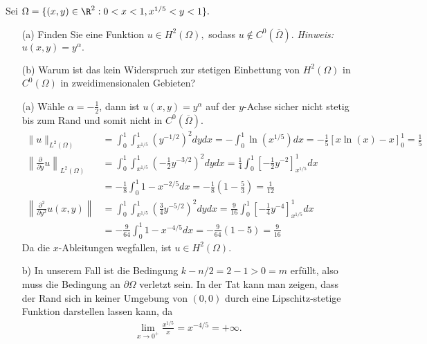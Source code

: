 
\begin{exercise}

  Sei $\Omega = \{(x, y) \in \R^2: 0 < x < 1, x^{1/5} < y < 1\}.$
  \begin{itemize}
      \item[(a)] Finden Sie eine Funktion $u \in H^2(\Omega),$ sodass $u \not\in C^0(\overline{\Omega}).$ \textit{Hinweis:} $u(x, y) = y^\alpha.$
      \item[(b)] Warum ist das kein Widerspruch zur stetigen Einbettung von $H^2(\Omega)$ in $C^0(\Omega)$ in zweidimensionalen Gebieten?
  \end{itemize}

\end{exercise}


\begin{solution}
\phantom{}
\begin{itemize}
    \item[(a)] Wähle $\alpha = -\frac{1}{2}$, dann ist $u(x,y) = y^{\alpha}$ auf der $y$-Achse
    sicher nicht stetig bis zum Rand und somit nicht in $C^0(\overline{\Omega})$.
    \begin{align*}
      \|u\|_{L^2(\Omega)} &= \int_0^1\int_{x^{1/5}}^1 (y^{-1/2})^2 dy dx
      = -\int_0^1 \ln(x^{1/5}) dx = -\frac{1}{5}[x\ln(x) - x]_0^1 = \frac{1}{5} \\
      \left\|\frac{\partial}{\partial y}u\right\|_{L^2(\Omega)} &=
      \int_0^1\int_{x^{1/5}}^1 \left(-\frac{1}{2}y^{-3/2}\right)^2 dy dx
      = \frac{1}{4}\int_0^1\left[-\frac{1}{2}y^{-2}\right]_{x^{1/5}}^1 dx \\
      &= -\frac{1}{8}\int_0^1 1 - x^{-2/5} dx = -\frac{1}{8}\left(1 - \frac{5}{3}\right) = \frac{1}{12} \\
      \left\|\frac{\partial^2}{\partial y^2}u(x,y)\right\| &=
      \int_0^1\int_{x^{1/5}}^1 \left(\frac{3}{4}y^{-5/2}\right)^2 dy dx
      = \frac{9}{16}\int_0^1 \left[-\frac{1}{4}y^{-4}\right]_{x^{1/5}}^1 dx \\
      &= -\frac{9}{64}\int_0^1 1 - x^{-4/5} dx = -\frac{9}{64}(1 - 5) = \frac{9}{16}
    \end{align*}
    Da die $x$-Ableitungen wegfallen, ist $u \in H^2(\Omega)$.
    \item[b)]
    In unserem Fall ist die Bedingung $k - n/2 = 2 - 1 > 0 = m$ erfüllt, also
    muss die Bedingung an $\partial \Omega$ verletzt sein.
    In der Tat kann man zeigen, dass der Rand sich in keiner Umgebung von $(0,0)$
    durch eine Lipschitz-stetige Funktion darstellen lassen kann, da
    \begin{align*}
      \lim_{x \to 0^+}\frac{x^{1/5}}{x} = x^{-4/5} = +\infty.
    \end{align*}
\end{itemize}


\end{solution}

